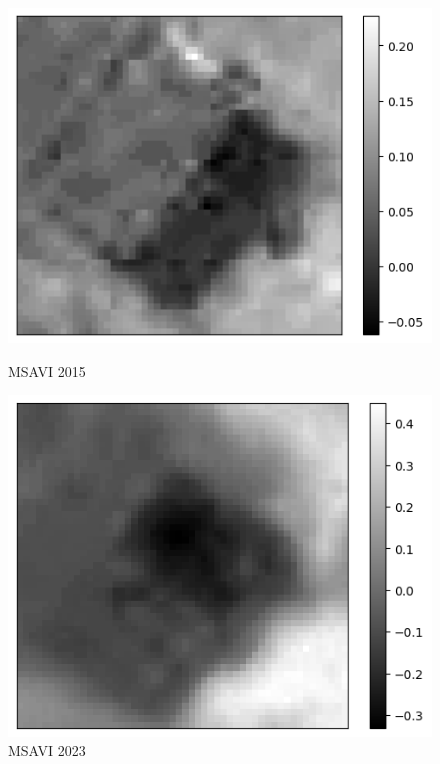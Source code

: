 \documentclass[a4paper,12pt]{article}  %
\begin{document}
\begin{figure}[H]
    \centering
    \begin{minipage}{0.45\textwidth}
        \centering
        \includegraphics[width=\linewidth]{spektralne/msavi_budynek7_2015.png}
        \caption*{MSAVI 2015}
    \end{minipage}
    \begin{minipage}{0.45\textwidth}
        \centering
        \includegraphics[width=\linewidth]{spektralne/msavi_budynek7_2023.png}
        \caption*{MSAVI 2023}
    \end{minipage}
\end{figure}
\end{document}
